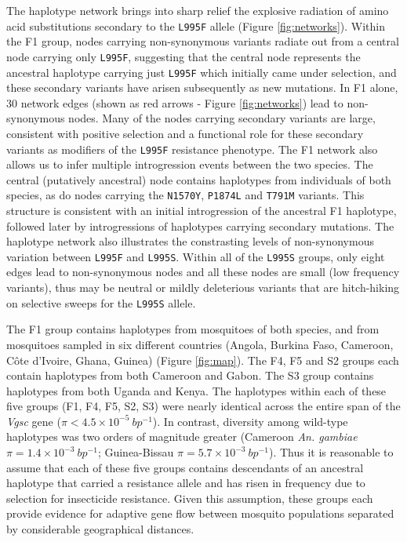 \documentclass[a4paper,11pt,abstracton,hidelinks]{scrartcl}
\begin{document}
%
The haplotype network brings into sharp relief the explosive radiation of amino acid substitutions secondary to the \texttt{L995F} allele (Figure \ref{fig:networks}).
%
Within the F1 group, nodes carrying non-synonymous variants radiate out from a central node carrying only \texttt{L995F}, suggesting that the central node represents the ancestral haplotype carrying just \texttt{L995F} which initially came under selection, and these secondary variants have arisen subsequently as new mutations.
%
In F1 alone, 30 network edges (shown as red arrows - Figure \ref{fig:networks}) lead to non-synonymous nodes.
%
Many of the nodes carrying secondary variants are large, consistent with positive selection and a functional role for these secondary variants as modifiers of the \texttt{L995F} resistance phenotype.
%
The F1 network also allows us to infer multiple introgression events between the two species.
%
The central (putatively ancestral) node contains haplotypes from individuals of both species, as do nodes carrying the \texttt{N1570Y}, \texttt{P1874L} and \texttt{T791M} variants.
%
This structure is consistent with an initial introgression of the ancestral F1 haplotype, followed later by introgressions of haplotypes carrying secondary mutations.
%
The haplotype network also illustrates the constrasting levels of non-synonymous variation between \texttt{L995F} and \texttt{L995S}.
%
Within all of the \texttt{L995S} groups, only eight edges lead to non-synonymous nodes and all these nodes are small (low frequency variants), thus may be neutral or mildly deleterious variants that are hitch-hiking on selective sweeps for the \texttt{L995S} allele.

%
The F1 group contains haplotypes from mosquitoes of both species, and from mosquitoes sampled in six different countries (Angola, Burkina Faso, Cameroon, C\^{o}te d'Ivoire, Ghana, Guinea) (Figure \ref{fig:map}).
%
The F4, F5 and S2 groups each contain haplotypes from both Cameroon and Gabon.
%
The S3 group contains haplotypes from both Uganda and Kenya.
%
The haplotypes within each of these five groups (F1, F4, F5, S2, S3) were nearly identical across the entire span of the \textit{Vgsc} gene ($\pi < 4.5 \times 10^{-5}\ bp^{-1}$).
%
In contrast, diversity among wild-type haplotypes was two orders of magnitude greater (Cameroon \textit{An. gambiae} $\pi = 1.4 \times 10^{-3}\ bp^{-1}$; Guinea-Bissau $\pi = 5.7 \times 10^{-3}\ bp^{-1}$).
%
Thus it is reasonable to assume that each of these five groups contains descendants of an ancestral haplotype that carried a resistance allele and has risen in frequency due to selection for insecticide resistance.
%
Given this assumption, these groups each provide evidence for adaptive gene flow between mosquito populations separated by considerable geographical distances.
%
\end{document}
